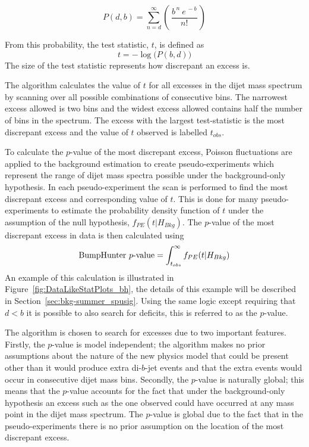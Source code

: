 \begin{equation}
  P(d,b) = \sum_{n=d}^{\infty} \left(\,\frac{b^{\,n}~e^{\,-b}}{n!}\,\right)
\end{equation}

\vfill
\newpage

\noindent
From this probability, the \bh{} test statistic, $t$, is defined as
\begin{equation}
 t = -\log{\big(P(b,d)\big)}
\end{equation}
The size of the test statistic represents how discrepant an excess is.

The \bh{} algorithm calculates the value of $t$ for all excesses in the dijet mass spectrum
by scanning over all possible combinations of consecutive bins.
The narrowest excess allowed is two bins and the widest excess allowed contains half the number of bins in the spectrum.
The excess with the largest \bh{} test-statistic is the most discrepant excess and the value of $t$ observed is labelled $t_{obs}$.

To calculate the \mbox{$p$-value} of the most discrepant excess,
Poisson fluctuations are applied to the background estimation to create pseudo-experiments
which represent the range of dijet mass spectra possible under the background-only hypothesis.
In each pseudo-experiment the \bh{} scan is performed to find the most discrepant excess and corresponding value of $t$.
This is done for many pseudo-experiments to estimate the probability density function of $t$ under the assumption of the null hypothesis, $f_{PE}(t| H_{Bkg})$.
The \bh{} \mbox{$p$-value} of the most discrepant excess in data is then calculated using
\begin{equation}
  \text{BumpHunter{}}~p\text{-value} = \int_{t_{obs}}^\infty f_{PE}(t | H_{Bkg})
\end{equation}
An example of this calculation is illustrated in Figure~\ref{fig:DataLikeStatPlots_bh},
the details of this example will be described in Section~\ref{sec:bkg-summer_spusig}.
Using the same logic except requiring that $d < b$ it is possible to also search for deficits,
this is referred to as the \dhunt{} \mbox{$p$-value}.

The \bh{} algorithm is chosen to search for excesses due to two important features.
Firstly, the \bh{} \mbox{$p$-value} is model independent;
the algorithm makes no prior assumptions about the nature of the new physics model that could be present
other than it would produce extra di-$b$-jet events and that the extra events would occur in consecutive dijet mass bins.
Secondly, the \bh{} \mbox{$p$-value} is naturally global;
this means that the \mbox{$p$-value} accounts for the fact that under the background-only hypothesis
an excess such as the one observed could have occurred at any mass point in the dijet mass spectrum.
The \bh{} $p$-value is global due to the fact that in the pseudo-experiments there is no prior assumption on the location of the most discrepant excess.


